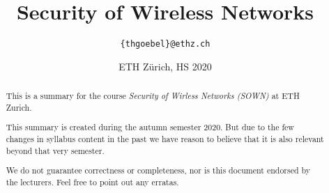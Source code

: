 \documentclass[paper=a4, parskip=half-]{scrartcl}
\title{Security of Wireless Networks}
\author{\texttt{\{thgoebel\}@ethz.ch}}
\date{ETH Zürich, HS 2020}
\begin{document}
\begin{titlepage}
\maketitle
\vspace{5cm}
\thispagestyle{empty}


\begin{abstract}
This is a summary for the course \textit{Security of Wirless Networks (SOWN)} at ETH Zurich.

This summary is created during the autumn semester 2020.
But due to the few changes in syllabus content in the past we have reason to believe that it is also relevant beyond that very semester.

We do not guarantee correctness or completeness, nor is this document endorsed by the lecturers.
Feel free to point out any erratas.
\end{abstract}

\end{titlepage}

\tableofcontents
\newpage



\newpage


\newpage


\newpage


\newpage


\newpage


\newpage


\end{document}

